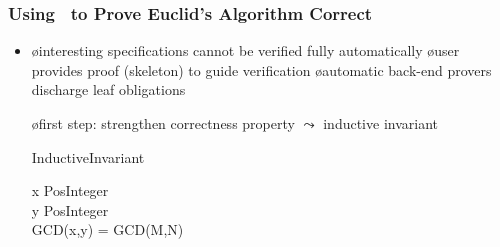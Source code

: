 \documentclass[fleqn]{beamer}
\begin{document}
\begin{frame}
  \frametitle{Using \tlaps\ to Prove Euclid's Algorithm Correct}

  \begin{itemize}
  \item {}

  \oo {}

    \begin{itemize}
    \o interesting specifications cannot be verified fully automatically
    \o user provides proof (skeleton) to guide verification
    \o automatic back-end provers discharge leaf obligations
    \end{itemize}

\pause

  \oo {}

    \begin{itemize}
    \o first step: strengthen correctness property $\leadsto$ \alert{inductive invariant}

       \medskip
       \begin{tlablock}[.7]
         InductiveInvariant\ \deq\ 
         \begin{conj}
           x \in PosInteger\\
           y \in PosInteger\\
           GCD(x,y) = GCD(M,N)
         \end{conj}
       \end{tlablock}
    \end{itemize}
  \end{itemize}
\end{frame}
\end{document}
